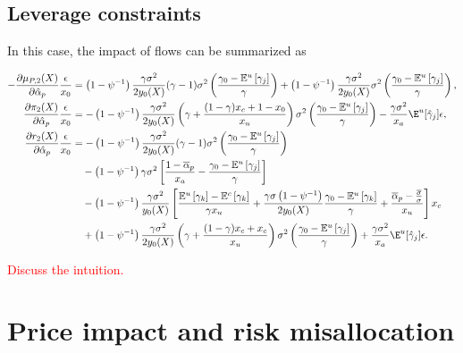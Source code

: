 \subsection{Leverage constraints}
In this case, the impact of flows can be summarized as
\begin{small}
	\begin{align*}
		-\frac{\partial\mu_{P,2}(X)}{\partial\hat{\alpha}_p}\frac{\epsilon}{x_0}&=\left(1-\psi^{-1}\right)\frac{\gamma\sigma^2}{2y_0(X)}(\gamma-1)\sigma^2\left(\frac{\gamma_{0}-\mathbb{E}^{u}\left[\gamma_{j}\right]}{\gamma}\right)
		+\left(1-\psi^{-1}\right)\frac{\gamma \sigma^{2}}{2 y_{0}(X)}\sigma^2\left(\frac{\gamma_{0}-\mathbb{E}^{u}\left[\gamma_{j}\right]}{\gamma}\right),\\
		\frac{\partial\pi_{2}(X)}{\partial\hat{\alpha}_p}\frac{\epsilon}{x_0}&=
		-\left(1-\psi^{-1}\right) \frac{\gamma \sigma^{2}}{2 y_{0}(X)}\left(\gamma+\frac{(1-\gamma)x_c+1-x_0}{x_u}\right)\sigma^2\left(\frac{\gamma_{0}-\mathbb{E}^{u}\left[\gamma_{j}\right]}{\gamma}\right)-\frac{\gamma\sigma^2}{x_a}\E^u[\hat{\gamma}_j]\epsilon,\\
		\frac{\partial r_{2}(X)}{\partial\hat{\alpha}_p}\frac{\epsilon}{x_0}&=
		-\left(1-\psi^{-1}\right)\frac{\gamma\sigma^2}{2y_0(X)}(\gamma-1)\sigma^2\left(\frac{\gamma_{0}-\mathbb{E}^{u}\left[\gamma_{j}\right]}{\gamma}\right)\\
		&\quad-\left(1-\psi^{-1}\right)\gamma\sigma^2\left[\frac{1-\overline{\alpha}_{p}}{x_{a}}-\frac{\gamma_{0}-\mathbb{E}^{u}\left[\gamma_{j}\right]}{\gamma}\right]\\
		&\quad-\left(1-\psi^{-1}\right) \frac{\gamma \sigma^{2}}{y_{0}(X)}\left[\frac{\mathbb{E}^{u}\left[\gamma_{k}\right]-\mathbb{E}^{c}\left[\gamma_{k}\right]}{\gamma x_{u}}+\frac{\gamma \sigma\left(1-\psi^{-1}\right)}{2 y_{0}(X)} \frac{\gamma_{0}-\mathbb{E}^{u}\left[\gamma_{k}\right]}{\gamma}+\frac{\overline{\alpha}_{p}-\frac{\overline{\sigma}}{\sigma}}{x_{u}}\right] x_{c}\\
		&\quad+\left(1-\psi^{-1}\right)\frac{\gamma \sigma^{2}}{2 y_{0}(X)}\left(\gamma+\frac{(1-\gamma)x_c+x_c}{x_u}\right)\sigma^2\left(\frac{\gamma_{0}-\mathbb{E}^{u}\left[\gamma_{j}\right]}{\gamma}\right)+\frac{\gamma\sigma^2}{x_a}\E^u[\hat{\gamma}_j]\epsilon.
	\end{align*}
\end{small}
\textcolor{red}{Discuss the intuition.}


\section{Price impact and risk misallocation}


